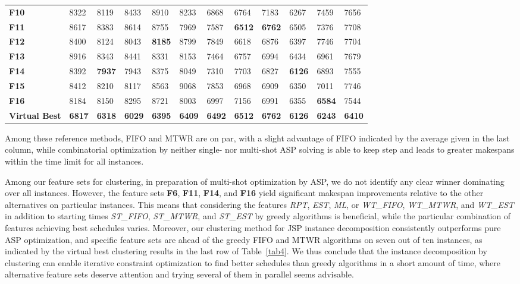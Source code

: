 \documentclass[runningheads]{llncs}
\newcommand{\stest}{\textit{ST\_EST}\xspace}
\newcommand{\stmtwr}{\textit{ST\_MTWR}\xspace}
\newcommand{\stfifo}{\textit{ST\_FIFO}\xspace}
\newcommand{\wtest}{\textit{WT\_EST}\xspace}
\newcommand{\wtmtwr}{\textit{WT\_MTWR}\xspace}
\newcommand{\wtfifo}{\textit{WT\_FIFO}\xspace}
\begin{document}
\begin{table}[bt]
\begin{center}
\begin{tabular}{|l|l|l|l|l|l|l|l|l|l|l|l|}
      \textbf{F10}  & 8322  & 8119  & 8433 & 8910 & 8233 & 6868 & 6764 & 7183 & 6267 & 7459 & 7656 \\
      \textbf{F11} & 8617  & 8383  & 8614 & 8755 & 7969 & 7587 & \textbf{6512} & \textbf{6762}& 6505 & 7376 & 7708 \\
      \textbf{F12} & 8400  & 8124  & 8043 & \textbf{8185} & 8799 & 7849 & 6618 & 6876 & 6397 & 7746 & 7704 \\
      \textbf{F13} & 8916 & 8343  & 8441 & 8331 & 8153 & 7464 & 6757 & 6994 & 6434 & 6961 & 7679 \\
      \textbf{F14} & 8392  & \textbf{7937} & 7943 & 8375 & 8049 & 7310 & 7703 & 6827 & \textbf{6126} & 6893 & 7555 \\
      \textbf{F15} & 8412  & 8210  & 8117 & 8563 & 9068 & 7853 & 6968 & 6909 & 6350  & 7011 & 7746 \\
      \textbf{F16} & 8184 & 8150 & 8295 & 8721 & 8003 & 6997 & 7156 & 6991 & 6355 & \textbf{6584} & 7544 \\ 
      \textbf{Virtual Best} & \textbf{6817} & \textbf{6318} & \textbf{6029} & \textbf{6395} & \textbf{6409} & \textbf{6492} & \textbf{6512} & \textbf{6762} & \textbf{6126} & \textbf{6243} & \textbf{6410} \\
\hline
      \end{tabular}
  \end{center}
\end{table}

Among these reference methods, FIFO and MTWR are on par, with a slight advantage of FIFO indicated
by the average given in the last column, while combinatorial optimization by neither single- nor multi-shot ASP 
solving is able to keep step and leads to greater makespans within the time limit for all instances.

Among our feature sets for clustering, in preparation of multi-shot optimization by ASP,
we do not identify any clear winner dominating over all instances.
However, the feature sets \textbf{F6}, \textbf{F11}, \textbf{F14}, and \textbf{F16}
yield significant makespan improvements relative to the other alternatives on particular instances.
This means that considering the features \textit{RPT}, \textit{EST}, \textit{ML}, or
\wtfifo, \wtmtwr, and \wtest in addition to starting times \stfifo, \stmtwr, and \stest by
greedy algorithms is beneficial, while the particular combination of features achieving best schedules varies.
Moreover, our clustering method for JSP instance decomposition consistently outperforms pure ASP optimization,
and specific feature sets are ahead of the greedy FIFO and MTWR algorithms on seven out of ten instances,
as indicated by the virtual best clustering results in the last row of Table~\ref{tab4}.
We thus conclude that the instance decomposition by clustering can enable iterative constraint optimization
to find better schedules than greedy algorithms in a short amount of time, where alternative feature sets deserve
attention and trying several of them in parallel seems advisable.
\end{document}
